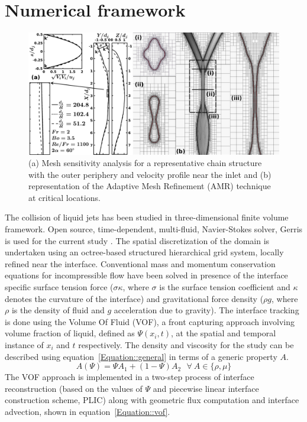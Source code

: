 \documentclass[%
 aip,
 sd,%
amsmath,amssymb,
preprint,%
author-year,%
]{revtex4-1}
\begin{document}
\section{Numerical framework}
\begin{figure}
	\centering
	\includegraphics[width=\textwidth]{Figure2}
	\caption{(a) Mesh sensitivity analysis for a representative chain structure with the outer periphery and velocity profile near the inlet and (b) representation of the Adaptive Mesh Refinement (AMR) technique at critical locations.}
	\label{Figure::gisetal}
\end{figure}
The collision of liquid jets has been studied in three-dimensional finite volume framework. Open source, time-dependent, multi-fluid, Navier-Stokes solver, Gerris is used for the current study \citep{Popinet2003}. The spatial discretization of the domain is undertaken using an octree-based structured hierarchical grid system, locally refined near the interface. Conventional mass and momentum conservation equations for incompressible flow have been solved in presence of the interface specific surface tension force ($\sigma \kappa$, where $\sigma$ is the surface tension coefficient and $\kappa$ denotes the curvature of the interface) and gravitational force density ($\rho g$, where $\rho$ is the density of fluid and $g$ acceleration due to gravity). The interface tracking is done using the Volume Of Fluid (VOF), a front capturing approach involving volume fraction of liquid, defined as $\Psi(x_i, t)$, at the spatial and temporal instance of $x_i$ and $t$ respectively. The density and viscosity for the study can be described using equation~\ref{Equation::general} in terms of a generic property $A$.
\begin{equation} \label{Equation::general}
A (\Psi) = \Psi A_1 + (1-\Psi)A_2 \: \: \:  \forall  \: A \in \{\rho, \mu\}
\end{equation}
The VOF approach is implemented in a two-step process of interface reconstruction (based on the values of $\Psi$ and piecewise linear interface construction scheme, PLIC) along with geometric flux computation and interface advection, shown in equation~\ref{Equation::vof}.
\end{document}
